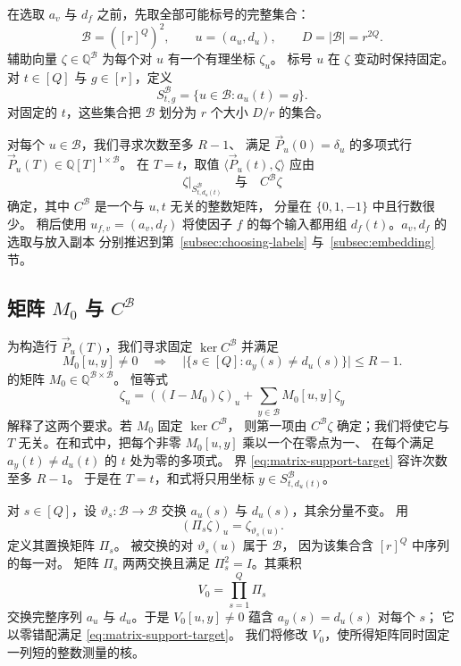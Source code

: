 \documentclass[11pt,reqno]{amsart}
\numberwithin{equation}{section}
\theoremstyle{definition}\newtheorem{definition}[theorem]{定义}
\theoremstyle{remark}\newtheorem{remark}[theorem]{注}
\renewcommand{\le}{\leqslant}
\begin{document}
在选取 $a_v$ 与 $d_f$ 之前，先取全部可能标号的完整集合：
\begin{equation}\label{eq:auxiliary-labels}
 \mathcal B=([r]^Q)^2,\qquad u=(a_u,d_u),\qquad D=|\mathcal B|=r^{2Q}.
\end{equation}
辅助向量 $\zeta\in\mathbb Q^{\mathcal B}$
为每个对 $u$ 有一个有理坐标 $\zeta_u$。
标号 $u$ 在 $\zeta$ 变动时保持固定。
对 $t\in[Q]$ 与 $g\in[r]$，定义
\begin{equation}\label{eq:auxiliary-groups}
 S^{\mathcal B}_{t,g}=\{u\in\mathcal B:a_u(t)=g\}.
\end{equation}
对固定的 $t$，这些集合把 $\mathcal B$ 划分为 $r$ 个大小
$D/r$ 的集合。

对每个 $u\in\mathcal B$，我们寻求次数至多 $R-1$、
满足 $\vec{P}_u(0)=\delta_u$ 的多项式行
$\vec{P}_u(T)\in\mathbb Q[T]^{1\times\mathcal B}$。
在 $T=t$，取值 $\langle \vec{P}_u(t), \zeta\rangle$
应由
\[
 \zeta|_{S^{\mathcal B}_{t,d_u(t)}}
 \quad\text{与}\quad C^{\mathcal B}\zeta
\]
确定，其中 $C^{\mathcal B}$ 是一个与 $u,t$ 无关的整数矩阵，
分量在 $\{0,1,-1\}$ 中且行数很少。
稍后使用 $u_{f,v}=(a_v,d_f)$ 将使因子 $f$
的每个输入都用组 $d_f(t)$。$a_v,d_f$ 的选取与放入副本
分别推迟到第~\ref{subsec:choosing-labels}
与~\ref{subsec:embedding} 节。

\subsection{矩阵 $M_0$ 与 $C^{\mathcal B}$}
为构造行 $\vec{P}_u(T)$，我们寻求固定 $\ker C^{\mathcal B}$
并满足
\begin{equation}\label{eq:matrix-support-target}
 M_0[u,y]\ne0\quad\Longrightarrow\quad
 \bigl|\{s\in[Q]:a_y(s)\ne d_u(s)\}\bigr|\le R-1.
\end{equation}
的矩阵 $M_0\in\mathbb Q^{\mathcal B\times\mathcal B}$。
恒等式
\begin{equation}\label{eq:coordinate-decomposition}
 \zeta_u=((I-M_0)\zeta)_u+
          \sum_{y\in\mathcal B}M_0[u,y]\zeta_y
\end{equation}
解释了这两个要求。若 $M_0$ 固定 $\ker C^{\mathcal B}$，
则第一项由 $C^{\mathcal B}\zeta$ 确定；我们将使它与 $T$
无关。在和式中，把每个非零 $M_0[u,y]$ 乘以一个在零点为一、
在每个满足 $a_y(t)\ne d_u(t)$ 的 $t$ 处为零的多项式。
界 \eqref{eq:matrix-support-target} 容许次数至多 $R-1$。
于是在 $T=t$，和式将只用坐标 $y\in S^{\mathcal B}_{t,d_u(t)}$。

对 $s\in[Q]$，设 $\vartheta_s:\mathcal B\to\mathcal B$
交换 $a_u(s)$ 与 $d_u(s)$，其余分量不变。
用
\[
 (\Pi_s\zeta)_u=\zeta_{\vartheta_s(u)}.
\]
定义其置换矩阵 $\Pi_s$。
被交换的对 $\vartheta_s(u)$ 属于 $\mathcal B$，
因为该集合含 $[r]^Q$ 中序列的每一对。
矩阵 $\Pi_s$ 两两交换且满足 $\Pi_s^2=I$。其乘积
\[
 V_0=\prod_{s=1}^Q\Pi_s
\]
交换完整序列 $a_u$ 与 $d_u$。于是
$V_0[u,y]\ne0$ 蕴含 $a_y(s)=d_u(s)$ 对每个 $s$；
它以零错配满足 \eqref{eq:matrix-support-target}。
我们将修改 $V_0$，使所得矩阵同时固定一列短的整数测量的核。
\end{document}
